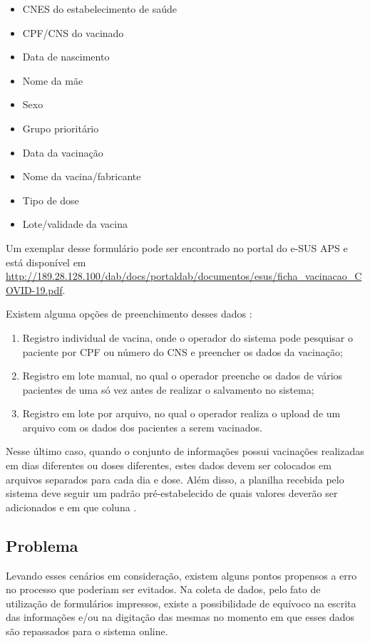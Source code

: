 \begin{itemize}
  \item CNES do estabelecimento de saúde
  \item CPF/CNS do vacinado
  \item Data de nascimento
  \item Nome da mãe
  \item Sexo
  \item Grupo prioritário
  \item Data da vacinação
  \item Nome da vacina/fabricante
  \item Tipo de dose
  \item Lote/validade da vacina
\end{itemize}

Um exemplar desse formulário pode ser encontrado no portal do e-SUS APS e está disponível em \url{http://189.28.128.100/dab/docs/portaldab/documentos/esus/ficha_vacinacao_COVID-19.pdf}.

Existem alguma opções de preenchimento desses dados \cite{roteiro2021sipni}:
\begin{enumerate}[label=\textbf{\roman*}]
  \item Registro individual de vacina, onde o operador do sistema pode pesquisar o paciente por CPF ou número do CNS e preencher os dados da vacinação;
  \item Registro em lote manual, no qual o operador preenche os dados de vários pacientes de uma só vez antes de realizar o salvamento no sistema;
  \item Registro em lote por arquivo, no qual o operador realiza o upload de um arquivo com os dados dos pacientes a serem vacinados.
\end{enumerate}

Nesse último caso, quando o conjunto de informações possui vacinações realizadas em dias diferentes ou doses diferentes, estes dados devem ser colocados em arquivos separados para cada dia e dose. Além disso, a planilha recebida pelo sistema deve seguir um padrão pré-estabelecido de quais valores deverão ser adicionados e em que coluna \cite{roteiro2021sipni}.

\subsection{Problema}
\label{cap1:SubSec:Problema}

Levando esses cenários em consideração, existem alguns pontos propensos a erro no processo que poderiam ser evitados. Na coleta de dados, pelo fato de utilização de formulários impressos, existe a possibilidade de equívoco na escrita das informações e/ou na digitação das mesmas no momento em que esses dados são repassados para o sistema online.


